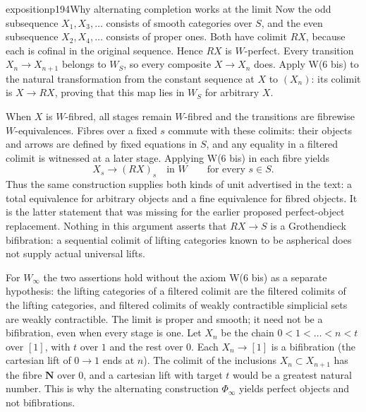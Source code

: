 \begin{dcomment}{exposition}{p194}{Why alternating completion works at the limit}
Now the odd subsequence $X_1,X_3,\ldots$ consists of smooth categories over $S$, and the even subsequence $X_2,X_4,\ldots$ consists of proper ones. Both have colimit $RX$, because each is cofinal in the original sequence. Hence $RX$ is $W$-perfect. Every transition $X_n\to X_{n+1}$ belongs to $W_S$, so every composite $X\to X_n$ does. Apply W(6 bis) to the natural transformation from the constant sequence at $X$ to $(X_n)$: its colimit is $X\to RX$, proving that this map lies in $W_S$ for arbitrary $X$.

When $X$ is $W$-fibred, all stages remain $W$-fibred and the transitions are fibrewise $W$-equivalences. Fibres over a fixed $s$ commute with these colimits: their objects and arrows are defined by fixed equations in $S$, and any equality in a filtered colimit is witnessed at a later stage. Applying W(6 bis) in each fibre yields
\[
 X_s\longrightarrow (RX)_s\quad\text{in }W
 \qquad\text{for every }s\in S.
\]
Thus the same construction supplies both kinds of unit advertised in the text: a total equivalence for arbitrary objects and a fine equivalence for fibred objects. It is the latter statement that was missing for the earlier proposed perfect-object replacement. Nothing in this argument asserts that $RX\to S$ is a Grothendieck bifibration: a sequential colimit of lifting categories known to be aspherical does not supply actual universal lifts.

For $W_\infty$ the two assertions hold without the axiom W(6 bis) as a separate hypothesis: the lifting categories of a filtered colimit are the filtered colimits of the lifting categories, and filtered colimits of weakly contractible simplicial sets are weakly contractible. The limit is proper and smooth; it need not be a bifibration, even when every stage is one. Let $X_n$ be the chain $0<1<\dots<n<t$ over $[1]$, with $t$ over $1$ and the rest over $0$. Each $X_n\to[1]$ is a bifibration (the cartesian lift of $0\to1$ ends at $n$). The colimit of the inclusions $X_n\subset X_{n+1}$ has the fibre $\mathbf N$ over $0$, and a cartesian lift with target $t$ would be a greatest natural number. This is why the alternating construction $\Phi_\infty$ yields perfect objects and not bifibrations.
\end{dcomment}

